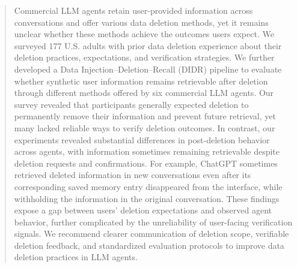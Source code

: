 \begin{abstract}


Commercial LLM agents retain user-provided information across conversations and offer various data deletion methods, yet it remains unclear whether these methods achieve the outcomes users expect.
%
We surveyed 177 U.S. adults with prior data deletion experience about their deletion practices, expectations, and verification strategies.
%
We further developed a Data Injection--Deletion--Recall (DIDR) pipeline to evaluate whether synthetic user information remains retrievable after deletion through different methods offered by six commercial LLM agents.
%
Our survey revealed that participants generally expected deletion to permanently remove their information and prevent future retrieval, yet many lacked reliable ways to verify deletion outcomes.
%
In contrast, our experiments revealed substantial differences in post-deletion behavior across agents, with information sometimes remaining retrievable despite deletion requests and confirmations.
%
For example, ChatGPT sometimes retrieved deleted information in new conversations even after its corresponding saved memory entry disappeared from the interface, while withholding the information in the original conversation.
%
These findings expose a gap between users' deletion expectations and observed agent behavior, further complicated by the unreliability of user-facing verification signals.
%
We recommend clearer communication of deletion scope, verifiable deletion feedback, and standardized evaluation protocols to improve data deletion practices in LLM agents.


\end{abstract}
